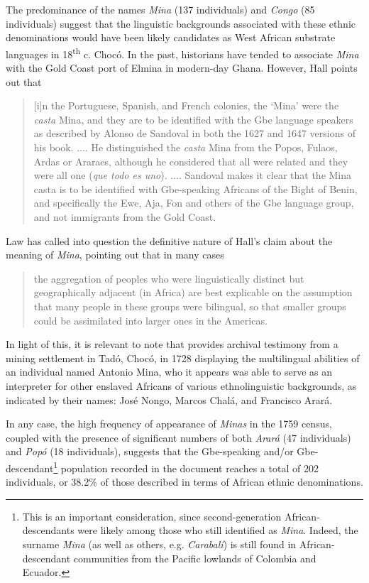 \documentclass[output=paper,colorlinks,citecolor=brown]{langscibook}
\begin{document}
The predominance of the names \emph{Mina} (137 individuals) and \emph{Congo} (85 individuals) suggest that the linguistic backgrounds associated with these ethnic denominations would have been likely candidates as West African substrate languages in 18\textsuperscript{th} c. Chocó. In the past, historians have tended to associate \emph{Mina} with the Gold Coast port of Elmina in modern-day Ghana. However, Hall points out that

\begin{quote}
    [i]n the Portuguese, Spanish, and French colonies, the ‘Mina’ were the \emph{casta} Mina, and they are to be identified with the Gbe language speakers as described by Alonso de Sandoval in both the 1627 and 1647 versions of his book. .... He distinguished the \emph{casta} Mina from the Popos, Fulaos, Ardas or Araraes, although he considered that all were related and they were all one (\emph{que todo es uno}). .... Sandoval makes it clear that the Mina casta is to be identified with Gbe-speaking Africans of the Bight of Benin, and specifically the Ewe, Aja, Fon and others of the Gbe language group, and not immigrants from the Gold Coast. \citep[70--71]{Hall_2003}
\end{quote}

Law has called into question the definitive nature of Hall’s claim about the meaning of \emph{Mina}, pointing out that in many cases 

\begin{quote}
    the aggregation of peoples who were linguistically distinct but geographically adjacent (in Africa) are best explicable on the assumption that many people in these groups were bilingual, so that smaller groups could be assimilated into larger ones in the Americas. \citep[267]{Law2005}
\end{quote}

In light of this, it is relevant to note that \citet[84]{Mosquera_2008} provides archival testimony from a mining settlement in Tadó, Chocó, in 1728 displaying the multilingual abilities of an individual named Antonio Mina, who it appears was able to serve as an interpreter for other enslaved Africans of various ethnolinguistic backgrounds, as indicated by their names: José Nongo, Marcos Chalá, and Francisco Arará. 

In any case, the high frequency of appearance of \emph{Minas} in the 1759 census, coupled with the presence of significant numbers of both \emph{Arará} (47 individuals) and \emph{Popó} (18 individuals), suggests that the Gbe-speaking and/or Gbe-descendant\footnote{This is an important consideration, since second-generation African-descendants were likely among those who still identified as \emph{Mina}. Indeed, the surname \emph{Mina} (as well as others, e.g. \emph{Carabalí}) is still found in African-descendant communities from the Pacific lowlands of Colombia and Ecuador.} population recorded in the document reaches a total of 202 individuals, or 38.2\% of those described in terms of African ethnic denominations.  
\end{document}
